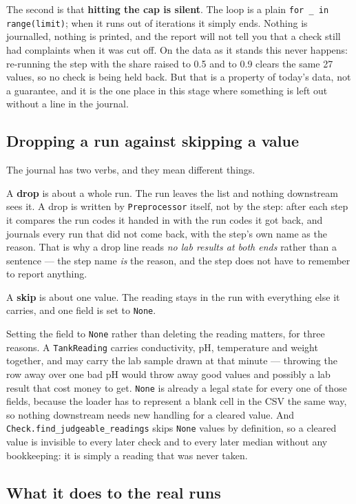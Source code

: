 The second is that \textbf{hitting the cap is silent}. The loop is a plain
\texttt{for \_ in range(limit)}; when it runs out of iterations it simply ends. Nothing is
journalled, nothing is printed, and the report will not tell you that a check still had
complaints when it was cut off. On the data as it stands this never happens: re-running the
step with the share raised to 0.5 and to 0.9 clears the same 27 values, so no check is being
held back. But that is a property of today's data, not a guarantee, and it is the one place in
this stage where something is left out without a line in the journal.

\subsection{Dropping a run against skipping a value}

The journal has two verbs, and they mean different things.

A \textbf{drop} is about a whole run. The run leaves the list and nothing downstream sees it.
A drop is written by \texttt{Preprocessor} itself, not by the step: after each step it compares
the run codes it handed in with the run codes it got back, and journals every run that did not
come back, with the step's own name as the reason. That is why a drop line reads
\emph{no lab results at both ends} rather than a sentence --- the step name \emph{is} the
reason, and the step does not have to remember to report anything.

A \textbf{skip} is about one value. The reading stays in the run with everything else it
carries, and one field is set to \texttt{None}.

Setting the field to \texttt{None} rather than deleting the reading matters, for three reasons.
A \texttt{TankReading} carries conductivity, pH, temperature and weight together, and may carry
the lab sample drawn at that minute --- throwing the row away over one bad pH would throw away
good values and possibly a lab result that cost money to get. \texttt{None} is already a legal
state for every one of those fields, because the loader has to represent a blank cell in the
CSV the same way, so nothing downstream needs new handling for a cleared value. And
\texttt{Check.find\_judgeable\_readings} skips \texttt{None} values by definition, so a cleared
value is invisible to every later check and to every later median without any bookkeeping: it
is simply a reading that was never taken.

\subsection{What it does to the real runs}

